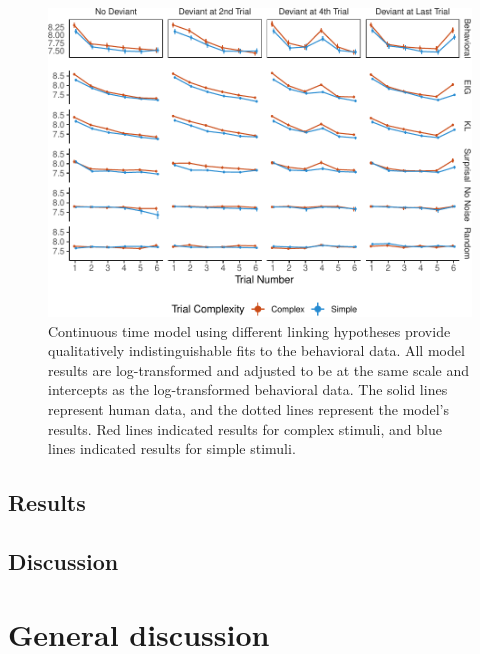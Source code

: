 \documentclass[10pt, letterpaper]{article}
\newenvironment{CodeChunk}{}{}
\begin{document}
\begin{CodeChunk}
\begin{figure}[h]

{\centering \includegraphics{figs/experiment_res-1} 

}

\caption[Continuous time model using different linking hypotheses provide qualitatively indistinguishable fits to the behavioral data]{Continuous time model using different linking hypotheses provide qualitatively indistinguishable fits to the behavioral data. All model results are log-transformed and adjusted to be at the same scale and intercepts as the log-transformed behavioral data. The solid lines represent human data, and the dotted lines represent the model's results. Red lines indicated results for complex stimuli, and blue lines indicated results for simple stimuli.}\label{fig:experiment_res}
\end{figure}
\end{CodeChunk}

\hypertarget{results-1}{%
\subsection{Results}\label{results-1}}

\hypertarget{discussion}{%
\subsection{Discussion}\label{discussion}}

\hypertarget{general-discussion}{%
\section{General discussion}\label{general-discussion}}
\end{document}
